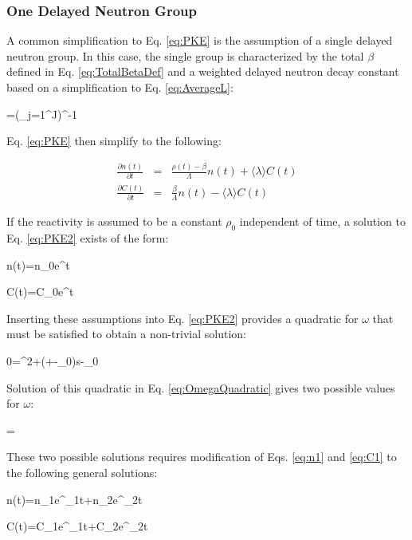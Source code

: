 \subsubsection{One Delayed Neutron Group}
\label{sec:OneDelayedGroup}
A common simplification to Eq. \eqref{eq:PKE} is the assumption of a single delayed neutron group. In this case, the single group is characterized by the total \(\beta\) defined in Eq. \eqref{eq:TotalBetaDef} and a weighted delayed neutron decay constant based on a simplification to Eq. \eqref{eq:AverageL}:

\beq
\langle\lambda\rangle=\left(\sum_{j=1}^J\right)^{-1}
\eeq

Eq. \eqref{eq:PKE} then simplify to the following:

\begin{subequations}
\label{eq:PKE2}
\begin{eqnarray}
\frac{\partial n(t)}{\partial t}&=&\frac{\rho(t)-\beta}{\Lambda}n(t)+\langle\lambda\rangle C(t)\\
\frac{\partial C(t)}{\partial t}&=&\frac{\beta}{\Lambda}n(t)-\langle\lambda\rangle C(t)
\end{eqnarray}
\end{subequations}

If the reactivity is assumed to be a constant \(\rho_0\) independent of time, a solution to Eq. \eqref{eq:PKE2} exists of the form:

\beq
\label{eq:n1}
n(t)=n_0e^{\omega t}
\eeq

\beq
\label{eq:C1}
C(t)=C_0e^{\omega t}
\eeq

Inserting these assumptions into Eq. \eqref{eq:PKE2} provides a quadratic for \(\omega\) that must be satisfied to obtain a non-trivial solution:

\beq
\label{eq:OmegaQuadratic}
0=\Lambda\omega^2+\left(\lambda\Lambda+\beta-\rho_0\right)s-\rho_0\lambda
\eeq

Solution of this quadratic in Eq. \eqref{eq:OmegaQuadratic} gives two possible values for \(\omega\):

\beq
\omega=
\eeq

These two possible solutions requires modification of Eqs. \eqref{eq:n1} and \eqref{eq:C1} to the following general solutions:

\beq
\label{eq:n2}
n(t)=n_1e^{\omega_1t}+n_2e^{\omega_2t}
\eeq

\beq
\label{eq:C2}
C(t)=C_1e^{\omega_1t}+C_2e^{\omega_2t}
\eeq

